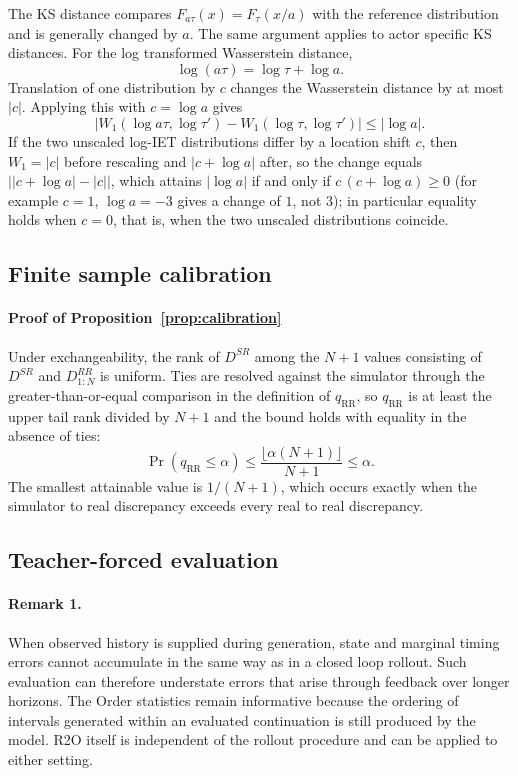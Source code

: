The KS distance compares $F_{a\tau}(x)=F_\tau(x/a)$ with the reference
distribution and is generally changed by $a$. The same argument applies to
actor specific KS distances. For the log transformed Wasserstein distance,
\[
\log(a\tau)=\log\tau+\log a.
\]
Translation of one distribution by $c$ changes the Wasserstein distance by at
most $|c|$. Applying this with $c=\log a$ gives
\[
\left|
W_1(\log a\tau,\log\tau')
-
W_1(\log\tau,\log\tau')
\right|
\leq |\log a|.
\]
If the two unscaled log-IET distributions differ by a location shift $c$, then
$W_1 = |c|$ before rescaling and $|c + \log a|$ after, so the change equals
$\bigl||c + \log a| - |c|\bigr|$, which attains $|\log a|$ if and only if
$c\,(c + \log a) \ge 0$ (for example $c = 1$, $\log a = -3$ gives a change of
$1$, not $3$); in particular equality holds when $c = 0$, that is, when the
two unscaled distributions coincide.

\subsection{Finite sample calibration}

\paragraph{Proof of Proposition~\ref{prop:calibration}}
Under exchangeability, the rank of $D^{SR}$ among the $N+1$ values consisting
of $D^{SR}$ and $D^{RR}_{1:N}$ is uniform. Ties are resolved against the
simulator through the greater-than-or-equal comparison in the definition of
$q_{\mathrm{RR}}$, so $q_{\mathrm{RR}}$ is at least the upper tail rank divided
by $N+1$ and the bound holds with equality in the absence of ties:
\[
\Pr(q_{\mathrm{RR}}\leq\alpha)
\leq
\frac{\lfloor \alpha(N+1)\rfloor}{N+1}
\leq \alpha.
\]
The smallest attainable value is $1/(N+1)$, which occurs exactly when the
simulator to real discrepancy exceeds every real to real discrepancy.

\subsection{Teacher-forced evaluation}
\label{rem:openloop}

\paragraph{Remark 1.}
When observed history is supplied during generation, state and marginal timing
errors cannot accumulate in the same way as in a closed loop rollout. Such
evaluation can therefore understate errors that arise through feedback over
longer horizons. The Order statistics remain informative because the ordering
of intervals generated within an evaluated continuation is still produced by
the model. R2O itself is independent of the rollout procedure and can be
applied to either setting.

